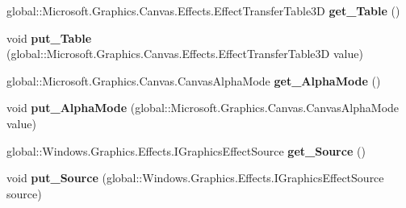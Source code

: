 \begin{DoxyCompactItemize}
\item 
\mbox{\label{interface_microsoft_1_1_graphics_1_1_canvas_1_1_effects_1_1_i_table_transfer3_d_effect_af4748ae4647dd78f75a59a61b482fc70}} 
global\+::\+Microsoft.\+Graphics.\+Canvas.\+Effects.\+Effect\+Transfer\+Table3D {\bfseries get\+\_\+\+Table} ()
\item 
\mbox{\label{interface_microsoft_1_1_graphics_1_1_canvas_1_1_effects_1_1_i_table_transfer3_d_effect_ab603763a514a44367ea6108e1369168a}} 
void {\bfseries put\+\_\+\+Table} (global\+::\+Microsoft.\+Graphics.\+Canvas.\+Effects.\+Effect\+Transfer\+Table3D value)
\item 
\mbox{\label{interface_microsoft_1_1_graphics_1_1_canvas_1_1_effects_1_1_i_table_transfer3_d_effect_a21d268378aa27ae6ca1034dd0f7299ca}} 
global\+::\+Microsoft.\+Graphics.\+Canvas.\+Canvas\+Alpha\+Mode {\bfseries get\+\_\+\+Alpha\+Mode} ()
\item 
\mbox{\label{interface_microsoft_1_1_graphics_1_1_canvas_1_1_effects_1_1_i_table_transfer3_d_effect_a2acd84164258602c46fd7ad7701b2a6b}} 
void {\bfseries put\+\_\+\+Alpha\+Mode} (global\+::\+Microsoft.\+Graphics.\+Canvas.\+Canvas\+Alpha\+Mode value)
\item 
\mbox{\label{interface_microsoft_1_1_graphics_1_1_canvas_1_1_effects_1_1_i_table_transfer3_d_effect_a99a72dee613feb6e1085470ab22cb3a9}} 
global\+::\+Windows.\+Graphics.\+Effects.\+I\+Graphics\+Effect\+Source {\bfseries get\+\_\+\+Source} ()
\item 
\mbox{\label{interface_microsoft_1_1_graphics_1_1_canvas_1_1_effects_1_1_i_table_transfer3_d_effect_a500a3b0cdf37153a399fb4230f6a6a3a}} 
void {\bfseries put\+\_\+\+Source} (global\+::\+Windows.\+Graphics.\+Effects.\+I\+Graphics\+Effect\+Source source)
\item 

\end{DoxyCompactItemize}
